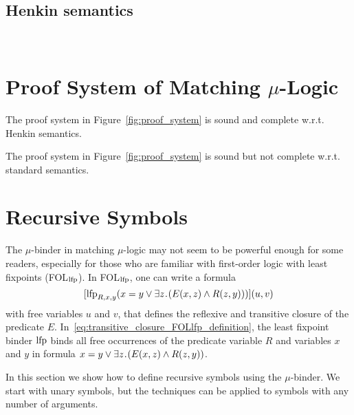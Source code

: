 \documentclass{amsart}
\begin{document}
\subsection{Henkin semantics}
\label{sec:hnk_semantics}

\quad\\

\section{Proof System of Matching $\mu$-Logic}



\begin{theorem}
The proof system in Figure~\ref{fig:proof_system} is sound and complete
w.r.t. Henkin semantics.
\end{theorem}

\begin{theorem}
The proof system in Figure~\ref{fig:proof_system} is sound but not complete
w.r.t. standard semantics.
\end{theorem}

\section{Recursive Symbols}
\label{sec:recursive_symbols}

The $\mu$-binder in matching $\mu$-logic may not
seem to be powerful enough for some readers, especially
for those who are familiar with first-order logic
with least fixpoints (FOL$_{\mathrm{lfp}}$).
In FOL$_{\mathrm{lfp}}$, one can write a formula
\begin{equation}
\label{eq:transitive_closure_FOLlfp_definition}
[\mathrm{lfp}_{R,x,y} (x = y \vee \exists z \mathbin{\!.\!} ( E(x,z) \wedge R(z,y) ))](u,v)
\end{equation}
with free variables $u$ and $v$, that defines
the reflexive and transitive closure of the predicate $E$.
In~\eqref{eq:transitive_closure_FOLlfp_definition},
the least fixpoint binder $\mathrm{lfp}$ binds all free occurrences of
the predicate variable $R$ and variables $x$ and $y$
in formula
$x = y \vee \exists z \mathbin{\!.\!} ( E(x,z) \wedge R(z,y) )$.


In this section we show how to define 
recursive symbols using the $\mu$-binder.
We start with unary symbols, but the techniques can be applied
to symbols with any number of arguments. 
\end{document}
